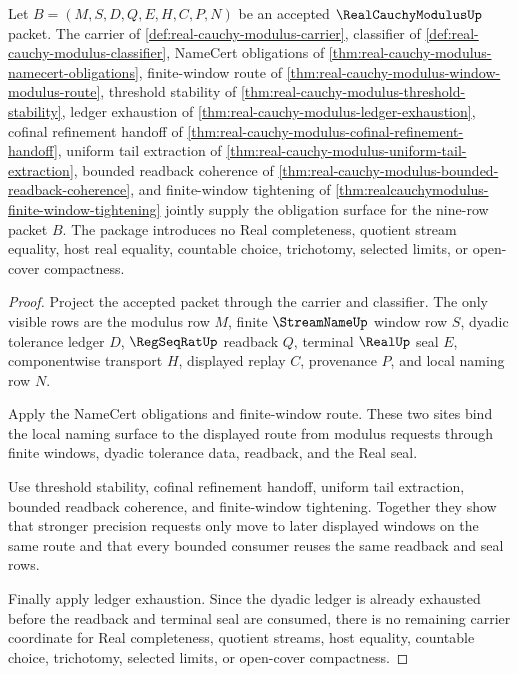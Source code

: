 \begin{theorem}
\label{thm:real-cauchy-modulus-obligation-closure-package}
Let $B=(M,S,D,Q,E,H,C,P,N)$ be an accepted $\RealCauchyModulusUp$ packet. The carrier of \autoref{def:real-cauchy-modulus-carrier}, classifier of \autoref{def:real-cauchy-modulus-classifier}, NameCert obligations of \autoref{thm:real-cauchy-modulus-namecert-obligations}, finite-window route of \autoref{thm:real-cauchy-modulus-window-modulus-route}, threshold stability of \autoref{thm:real-cauchy-modulus-threshold-stability}, ledger exhaustion of \autoref{thm:real-cauchy-modulus-ledger-exhaustion}, cofinal refinement handoff of \autoref{thm:real-cauchy-modulus-cofinal-refinement-handoff}, uniform tail extraction of \autoref{thm:real-cauchy-modulus-uniform-tail-extraction}, bounded readback coherence of \autoref{thm:real-cauchy-modulus-bounded-readback-coherence}, and finite-window tightening of \autoref{thm:realcauchymodulus-finite-window-tightening} jointly supply the obligation surface for the nine-row packet $B$. The package introduces no Real completeness, quotient stream equality, host real equality, countable choice, trichotomy, selected limits, or open-cover compactness.
\end{theorem}
\begin{proof}
Project the accepted packet through the carrier and classifier. The only visible rows are the modulus row $M$, finite $\StreamNameUp$ window row $S$, dyadic tolerance ledger $D$, $\RegSeqRatUp$ readback $Q$, terminal $\RealUp$ seal $E$, componentwise transport $H$, displayed replay $C$, provenance $P$, and local naming row $N$.

Apply the NameCert obligations and finite-window route. These two sites bind the local naming surface to the displayed route from modulus requests through finite windows, dyadic tolerance data, readback, and the Real seal.

Use threshold stability, cofinal refinement handoff, uniform tail extraction, bounded readback coherence, and finite-window tightening. Together they show that stronger precision requests only move to later displayed windows on the same route and that every bounded consumer reuses the same readback and seal rows.

Finally apply ledger exhaustion. Since the dyadic ledger is already exhausted before the readback and terminal seal are consumed, there is no remaining carrier coordinate for Real completeness, quotient streams, host equality, countable choice, trichotomy, selected limits, or open-cover compactness.
\end{proof}

